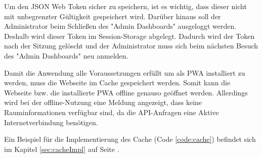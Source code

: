 
Um den JSON Web Token sicher zu speichern, ist es wichtig, dass dieser nicht mit unbegrenzter Gültigkeit gespeichert wird. Darüber hinaus soll der Administrator beim Schließen des "Admin Dashboards" ausgeloggt werden. Deshalb wird dieser Token im Session-Storage abgelegt. Dadurch wird der Token nach der Sitzung gelöscht und der Administrator muss sich beim nächsten Besuch des "Admin Dashboards" neu anmelden.


Damit die Anwendung alle Voraussetzungen erfüllt um als PWA installiert zu werden, muss die Webseite im Cache gespeichert werden. Somit kann die Webseite bzw. die installierte PWA offline genauso geöffnet werden. Allerdings wird bei der offline-Nutzung eine Meldung angezeigt, dass keine Rauminformationen verfügbar sind, da die API-Anfragen eine Aktive Internetverbindung benötigen.

Ein Beispiel für die Implementierung des Cache (Code \ref{code:cache}) befindet sich im Kapitel \ref{sec:cacheImpl} auf Seite \pageref{code:cache}.
 